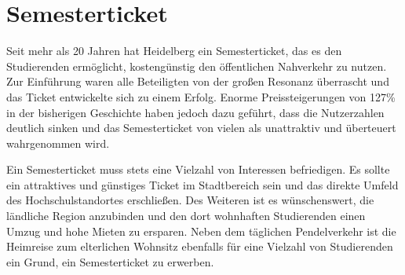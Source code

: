 


\section{Semesterticket}
Seit mehr als 20 Jahren hat Heidelberg ein Semesterticket, das es den Studierenden ermöglicht, kostengünstig den öffentlichen Nahverkehr zu nutzen. Zur Einführung waren alle Beteiligten von der großen Resonanz überrascht und das Ticket entwickelte sich zu einem Erfolg. Enorme Preissteigerungen von 127\% in der bisherigen Geschichte haben jedoch dazu geführt, dass die Nutzerzahlen deutlich sinken und das Semesterticket von vielen als unattraktiv und überteuert wahrgenommen wird.

Ein Semesterticket muss stets eine Vielzahl von Interessen befriedigen. Es sollte ein attraktives und günstiges Ticket im Stadtbereich sein und das direkte Umfeld des Hochschulstandortes erschließen. Des Weiteren ist es wünschenswert, die ländliche Region anzubinden und den dort wohnhaften Studierenden einen Umzug und hohe Mieten zu ersparen. Neben dem täglichen Pendelverkehr ist die Heimreise zum elterlichen Wohnsitz ebenfalls für eine Vielzahl von Studierenden ein Grund, ein Semesterticket zu erwerben.

